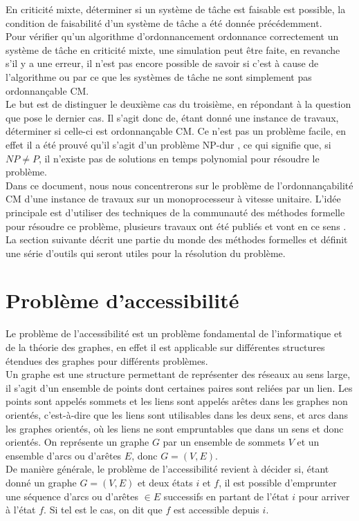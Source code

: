 \documentclass[a4paper]{report}
\theoremstyle{break}
\begin{document}
En criticité mixte, déterminer si un système de tâche est faisable est possible, la condition de faisabilité d'un système de tâche a été donnée précédemment.\\

Pour vérifier qu'un algorithme d'ordonnancement ordonnance correctement un système de tâche en criticité mixte, une simulation peut être faite, en revanche s'il y a une erreur, il n'est pas encore possible de savoir si c'est à cause de l'algorithme ou par ce que les systèmes de tâche ne sont simplement pas ordonnançable CM.\\

Le but est de distinguer le deuxième cas du troisième, en répondant à la question que pose le dernier cas. Il s'agit donc de, étant donné une instance de travaux, déterminer si celle-ci est ordonnançable CM. Ce n'est pas un problème facile, en effet il a été prouvé qu'il s'agit d'un problème NP-dur \cite{baruah2009mixed}, ce qui signifie que, si $NP \neq P$, il n'existe pas de solutions en temps polynomial pour résoudre le problème.\\

Dans ce document, nous nous concentrerons sur le problème de l'ordonnançabilité CM d'une instance de travaux sur un monoprocesseur à vitesse unitaire. L'idée principale est d'utiliser des techniques de la communauté des méthodes formelle pour résoudre ce problème, plusieurs travaux ont été publiés et vont en ce sens \cite{geeraerts2013multiprocessor} \cite{bakerbrute}. La section suivante décrit une partie du monde des méthodes formelles et définit une série d'outils qui seront utiles pour la résolution du problème.

\section{Problème d'accessibilité}
Le problème de l'accessibilité est un problème fondamental de l'informatique et de la théorie des graphes, en effet il est applicable sur différentes structures étendues des graphes pour différents problèmes.\\
Un graphe est une structure permettant de représenter des réseaux au sens large, il s'agit d'un ensemble de points dont certaines paires sont reliées par un lien. Les points sont appelés sommets et les liens sont appelés arêtes dans les graphes non orientés, c'est-à-dire que les liens sont utilisables dans les deux sens, et arcs dans les graphes orientés, où les liens ne sont empruntables que dans un sens et donc orientés. On représente un graphe $G$ par un ensemble de sommets $V$ et un ensemble d'arcs ou d'arêtes $E$, donc $G = (V, E)$.\\
De manière générale, le problème de l'accessibilité revient à décider si, étant donné un graphe $G = (V, E)$ et deux états $i$ et $f$, il est possible d'emprunter une séquence d'arcs ou d'arêtes $\in E$ successifs en partant de l'état $i$ pour arriver à l'état $f$. Si tel est le cas, on dit que $f$ est accessible depuis $i$.\\
\end{document}

